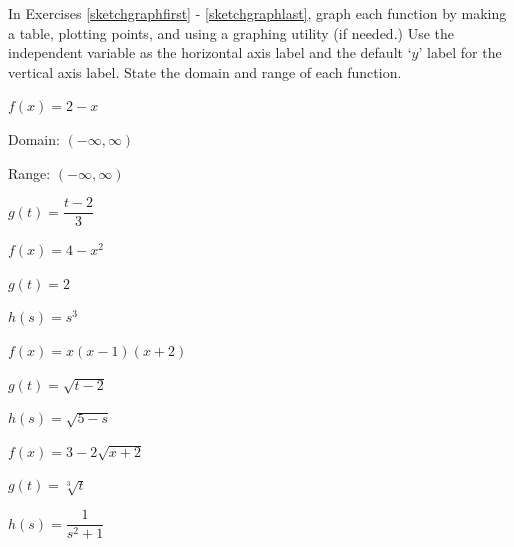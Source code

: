 \documentclass{ximera}
\begin{document}
\begin{question}
In Exercises \ref{sketchgraphfirst} - \ref{sketchgraphlast}, graph each function by making a table, plotting points, and using a graphing utility (if needed.)  Use the independent variable as the horizontal axis label and the default `$y$' label for the vertical axis label.  State the domain and range of each function. 

\begin{problem}\label{sketchgraphfirst}
$f(x) = 2-x$

\begin{solution}

Domain: $(-\infty, \infty)$ 

Range:  $(-\infty, \infty)$
\end{solution}
\end{problem}

\begin{problem}
$g(t) = \dfrac{t - 2}{3}$
\end{problem} 

\begin{problem}
$f(x) = 4-x^2$
\end{problem} 

\begin{problem}
$g(t) = 2$
\end{problem} 

\begin{problem}
$h(s) = s^3$
\end{problem} 

\begin{problem}
$f(x) = x(x-1)(x+2)$
\end{problem} 

\begin{problem}
$g(t) = \sqrt{t-2}$
\end{problem} 

\begin{problem}
$h(s) = \sqrt{5 - s}$
\end{problem}

\begin{problem}
$f(x) = 3-2\sqrt{x+2}$
\end{problem}

\begin{problem}
$g(t) = \sqrt[3]{t}$
\end{problem}

\begin{problem}\label{sketchgraphlast}
$h(s) = \dfrac{1}{s^{2} + 1}$
\end{problem}

\end{question}
\end{document}
